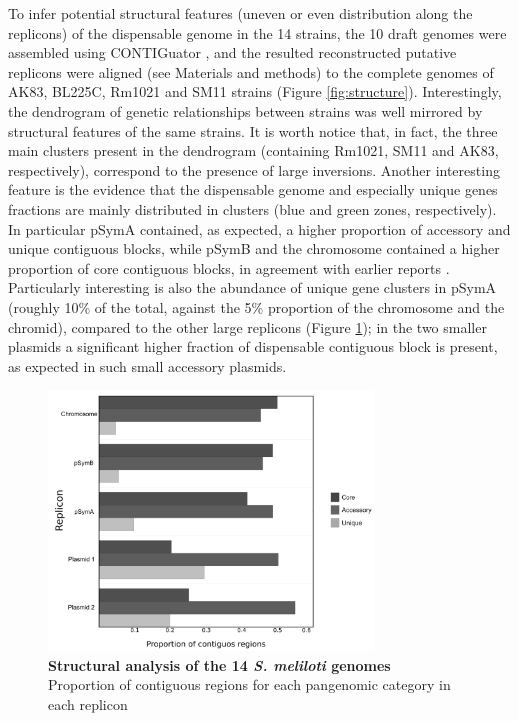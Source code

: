 To infer potential structural features (uneven or even distribution along the replicons) of the dispensable genome in the 14 strains, the 10 draft genomes were assembled using CONTIGuator \cite{galardini2011contiguator}, and the resulted reconstructed putative replicons were aligned (see Materials and  methods) to the complete genomes of AK83, BL225C, Rm1021 and SM11 strains (Figure \ref{fig:structure}). Interestingly, the dendrogram of genetic relationships between strains was well mirrored by structural features of the same strains. It is worth notice that, in fact, the three main clusters present in the dendrogram (containing Rm1021, SM11 and AK83, respectively), correspond to the presence of large inversions. Another interesting feature is the evidence that the dispensable genome and especially unique genes fractions are mainly distributed in clusters (blue and green zones, respectively). In particular pSymA contained, as expected, a higher proportion of accessory and unique contiguous blocks, while pSymB and the chromosome contained a higher proportion of core contiguous blocks, in agreement with earlier reports \cite{giuntini2005large}\cite{galardini2011exploring}. Particularly interesting is also the abundance of unique gene clusters in pSymA (roughly 10\% of the total, against the 5\% proportion of the chromosome and the chromid), compared to the other large replicons (Figure \ref{fig:structure2}); in the two smaller plasmids a significant higher fraction of dispensable contiguous block is present, as expected  in such small accessory plasmids.
\begin{figure}[!tb]
	\center
    \includegraphics[width=0.77\textwidth]{figures/4/thesis_33}
	\caption{\label{fig:structure2}\textbf{Structural analysis of the 14 \textit{S. meliloti} genomes}\\
	Proportion of contiguous regions for each pangenomic category in each replicon}
\end{figure}
